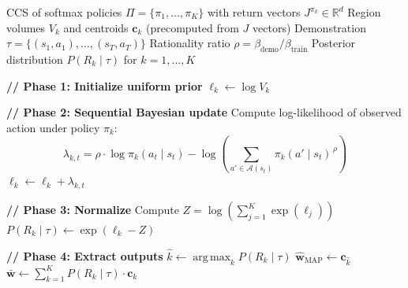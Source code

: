 \documentclass[11pt]{article}
\DeclareMathOperator*{\argmax}{arg\,max}
\begin{document}
\begin{algorithm}[H]
\caption{BMOPID: Bayesian Multi-Objective Preference Inference from Demonstration}
\label{alg:bmopid}
\begin{algorithmic}[1]
\Require CCS of softmax policies $\Pi = \{\pi_1, \ldots, \pi_K\}$ with return vectors $J^{\pi_k} \in \mathbb{R}^d$
\Require Region volumes $V_k$ and centroids $\mathbf{c}_k$ (precomputed from $J$ vectors)
\Require Demonstration $\tau = \{(s_1, a_1), \ldots, (s_T, a_T)\}$
\Require Rationality ratio $\rho = \beta_{\text{demo}} / \beta_{\text{train}}$
\Ensure Posterior distribution $P(R_k \mid \tau)$ for $k = 1, \ldots, K$
 
\Statex
\Statex \textbf{// Phase 1: Initialize uniform prior}
    \State $\ell_k \gets \log V_k$
\EndFor
 
\Statex
\Statex \textbf{// Phase 2: Sequential Bayesian update}
        \State Compute log-likelihood of observed action under policy $\pi_k$:
        \begin{equation*}
            \lambda_{k,t} = \rho \cdot \log \pi_k(a_t \mid s_t) - \log\!\left(\sum_{a' \in \mathcal{A}(s_t)} \pi_k(a' \mid s_t)^{\,\rho}\right)
        \end{equation*}
        \State $\ell_k \gets \ell_k + \lambda_{k,t}$
    \EndFor
\EndFor
 
\Statex
\Statex \textbf{// Phase 3: Normalize}
\State Compute $Z = \log\!\left(\sum_{j=1}^{K} \exp(\ell_j)\right)$
    \State $P(R_k \mid \tau) \gets \exp(\ell_k - Z)$
\EndFor
 
\Statex
\Statex \textbf{// Phase 4: Extract outputs}
\State $\hat{k} \gets \argmax_k P(R_k \mid \tau)$
\State $\hat{\mathbf{w}}_{\text{MAP}} \gets \mathbf{c}_{\hat{k}}$
\State $\bar{\mathbf{w}} \gets \sum_{k=1}^{K} P(R_k \mid \tau) \cdot \mathbf{c}_k$
\end{algorithmic}
\end{algorithm}
\end{document}
